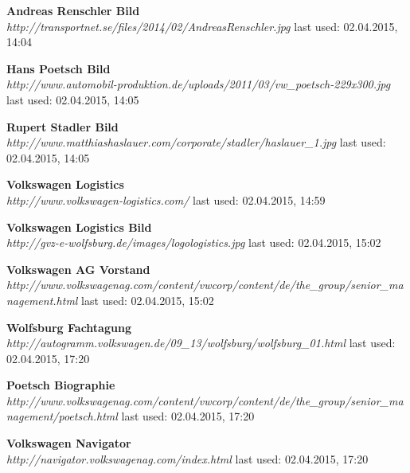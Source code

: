 \documentclass[12pt]{article}
\begin{document}
\begin{thebibliography}{56}
\textbf{Andreas Renschler Bild} \\
\textit{
	http://transportnet.se/files/2014/02/AndreasRenschler.jpg
}
\newline last used: 02.04.2015, 14:04

\textbf{Hans Poetsch Bild} \\
\textit{
	http://www.automobil-produktion.de/uploads/2011/03/vw\_poetsch-229x300.jpg
}
\newline last used: 02.04.2015, 14:05

\textbf{Rupert Stadler Bild} \\
\textit{
	http://www.matthiashaslauer.com/corporate/stadler/haslauer\_1.jpg
}
\newline last used: 02.04.2015, 14:05

\textbf{Volkswagen Logistics} \\
\textit{
	http://www.volkswagen-logistics.com/
}
\newline last used: 02.04.2015, 14:59

\textbf{Volkswagen Logistics Bild} \\
\textit{
	http://gvz-e-wolfsburg.de/images/logologistics.jpg
}
\newline last used: 02.04.2015, 15:02

\textbf{Volkswagen AG Vorstand} \\
\textit{
	http://www.volkswagenag.com/content/vwcorp/content/de/the\_group/senior\_management.html
}
\newline last used: 02.04.2015, 15:02

\textbf{Wolfsburg Fachtagung} \\
\textit{
	http://autogramm.volkswagen.de/09\_13/wolfsburg/wolfsburg\_01.html
}
\newline last used: 02.04.2015, 17:20

\textbf{Poetsch Biographie} \\
\textit{
	http://www.volkswagenag.com/content/vwcorp/content/de/the\_group/senior\_management/poetsch.html
}
\newline last used: 02.04.2015, 17:20

\textbf{Volkswagen Navigator} \\
\textit{
	http://navigator.volkswagenag.com/index.html
}
\newline last used: 02.04.2015, 17:20



\end{thebibliography}
\end{document}

